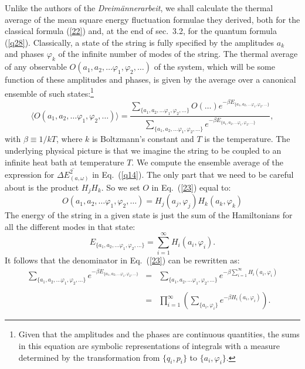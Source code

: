 \documentclass{elsart}
\begin{document}
Unlike the authors of the {\it Dreim\"annerarbeit}, we shall calculate the thermal average of the mean square energy fluctuation formulae they derived, both for the classical formula  (\ref{22})  and, at the end of sec.\ 3.2, for the quantum formula (\ref{q28}). Classically, a state of the string is fully specified by the amplitudes $a_k$ and phases $\varphi_k$ of the infinite number of modes of the string. The thermal average of any observable $O(a_1, a_2, \ldots \varphi_1, \varphi_2, \ldots)$ of the system, which will be some function of these amplitudes and phases, is given by the average over a canonical ensemble of such states:\footnote{Given that the amplitudes and the phases are continuous quantities, the sums in this equation are symbolic representations of integrals with a measure determined by the transformation from $\{ q_i, p_i \}$ to $\{ a_i,  \varphi_i\}$.}
\begin{equation}
\langle O(a_1, a_2, \ldots \varphi_1, \varphi_2, \ldots)  \rangle
= \frac{\displaystyle{\sum_{\{ a_1, a_2, \ldots \varphi_1, \varphi_2, \ldots\}} O(\ldots) e^{- \displaystyle{\beta E_{\{ a_1, a_2, \ldots \varphi_1, \varphi_2, \ldots\}}}}}}{
\displaystyle{\sum_{\{ a_1, a_2, \ldots \varphi_1, \varphi_2, \ldots\}} e^{- \displaystyle{\beta E_{\{ a_1, a_2, \ldots \varphi_1, \varphi_2, \ldots\}}}}}},
\label{23}
\end{equation} 
with $\beta \equiv 1/kT$, where $k$ is Boltzmann's constant and $T$ is the temperature. The underlying physical picture is that we imagine the string to be coupled to an infinite heat bath at temperature $T$. We compute the ensemble average of the expression for $\overline{\Delta E_{(a, \omega)}^2}$ in Eq.\ (\ref{q14}). The only part that we need to be careful about is the product $H_j H_k$. So we set $O$ in Eq.\ (\ref{23}) equal to:
\begin{equation}
O(a_1, a_2, \ldots \varphi_1, \varphi_2, \ldots) = H_j (a_j, \varphi_j) H_k (a_k, \varphi_k)
\label{24}
\end{equation}
The energy of the string in a given state is just the sum of the Hamiltonians for all the different modes in that state:
\begin{equation}
E_{\{ a_1, a_2, \ldots \varphi_1, \varphi_2, \ldots\}} = \sum_{i=1}^\infty H_i(a_i, \varphi_i).
\label{25}
\end{equation} 
It follows that the denominator in Eq.\ (\ref{23}) can be rewritten as:
\begin{eqnarray}
\displaystyle{\sum_{\{ a_1, a_2, \ldots \varphi_1, \varphi_2, \ldots\}} e^{- \displaystyle{\beta E_{\{ a_1, a_2, \ldots \varphi_1, \varphi_2, \ldots\}}}}} & = & 
\displaystyle{\sum_{\{ a_1, a_2, \ldots \varphi_1, \varphi_2, \ldots\}} e^{- \displaystyle{\beta \sum_{i=1}^\infty H_i(a_i, \varphi_i)}}}
\nonumber \\
 & & \label{26} \\
 & = & \prod_{i=1}^\infty \left( \sum_{\{ a_i, \varphi_i \}}
e^{ \displaystyle{ -\beta H_i(a_i, \varphi_i) } } \right).\nonumber
\end{eqnarray}
\end{document}
